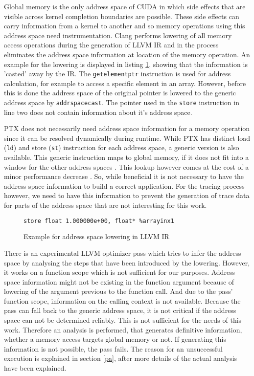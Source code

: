 Global memory is the only address space of CUDA in which side effects that are visible across kernel completion boundaries are possible. These side effects can carry information from a kernel to another and so memory operations using this address space need instrumentation. Clang performs lowering of all memory access operations during the generation of LLVM IR and in the process eliminates the address space information at location of the memory operation. An example for the lowering is displayed in listing \ref{lowering}, showing that the information is 'casted' away by the IR. The \verb|getelementptr| instruction is used
for address calculation, for example to access a specific element in an array. However, before this is done
the address space of the original pointer is lowered to the generic address space by \verb|addrspacecast|. The pointer used in the \verb|store| instruction in line two does not contain information about it's address space.
 
PTX does not necessarily need address space information for a memory operation since it can be resolved dynamically during runtime. While PTX has distinct load (\verb|ld|) and store (\verb|st|) instruction for
each address space, a generic version is also available. This generic instruction maps to global memory, if
it does not fit into a window for the other address spaces \cite{ptx isa}. This lookup however comes at the cost of a minor performance decrease \cite{infer-pass}. So, while beneficial it is not necessary to
have the address space information to build a correct application. For the tracing process however, we need to have this information to prevent the generation of trace data for parts of the address space that are not interesting for this work.

\begin{figure}
	\begin{lstlisting}[style=C]
%arrayinx1 = getelementptr inbounds (float, float* addrspacecast (float addrspace(3)* @_ZZ5saxpyfPfS_iPlS0_E2_x to float*), i64 0, i64 2)
store float 1.000000e+00, float* %arrayinx1
	\end{lstlisting}
	\caption{Example for address space lowering in LLVM IR}
	\label{lowering}
\end{figure}

There is an experimental LLVM optimizer pass which tries to infer the address space by analysing the steps that have been introduced by the lowering. However, it works on a function scope which is not sufficient for our purposes. Address space information  might not be existing in the function argument because of lowering of the argument previous to the function call. And due to the pass' function scope, information on the calling context is not available. Because the pass can fall back to the generic address space,
it is not critical if the address space can not be determined reliably. This is not sufficient for the needs of this work.
Therefore an  analysis is performed, that generates definitive information, whether a memory access targets
global memory or not. If generating this information is not possible, the pass fails. The reason for an unsuccessful execution is  explained in section \ref{pa}, after more details of the actual analysis have been explained.

